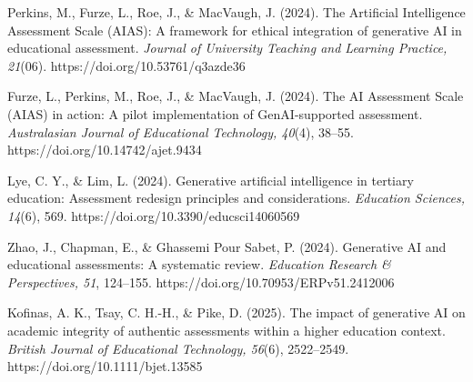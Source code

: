 \documentclass[
  spanish,
  letterpaper,
  DIV=11,
  numbers=noendperiod]{scrartcl}
\begin{document}
Perkins, M., Furze, L., Roe, J., \& MacVaugh, J. (2024). The Artificial
Intelligence Assessment Scale (AIAS): A framework for ethical
integration of generative AI in educational assessment. \emph{Journal of
University Teaching and Learning Practice, 21}(06).
https://doi.org/10.53761/q3azde36

Furze, L., Perkins, M., Roe, J., \& MacVaugh, J. (2024). The AI
Assessment Scale (AIAS) in action: A pilot implementation of
GenAI-supported assessment. \emph{Australasian Journal of Educational
Technology, 40}(4), 38--55. https://doi.org/10.14742/ajet.9434

Lye, C. Y., \& Lim, L. (2024). Generative artificial intelligence in
tertiary education: Assessment redesign principles and considerations.
\emph{Education Sciences, 14}(6), 569.
https://doi.org/10.3390/educsci14060569

Zhao, J., Chapman, E., \& Ghassemi Pour Sabet, P. (2024). Generative AI
and educational assessments: A systematic review. \emph{Education
Research \& Perspectives, 51}, 124--155.
https://doi.org/10.70953/ERPv51.2412006

Kofinas, A. K., Tsay, C. H.-H., \& Pike, D. (2025). The impact of
generative AI on academic integrity of authentic assessments within a
higher education context. \emph{British Journal of Educational
Technology, 56}(6), 2522--2549. https://doi.org/10.1111/bjet.13585
\end{document}
